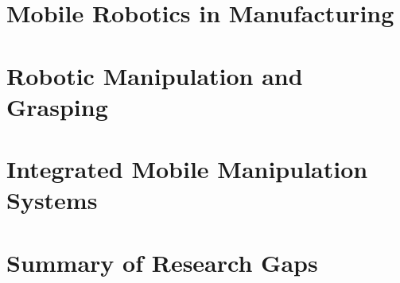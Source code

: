 
\section{Mobile Robotics in Manufacturing}

\section{Robotic Manipulation and Grasping}

\section{Integrated Mobile Manipulation Systems}

\section{Summary of Research Gaps}

